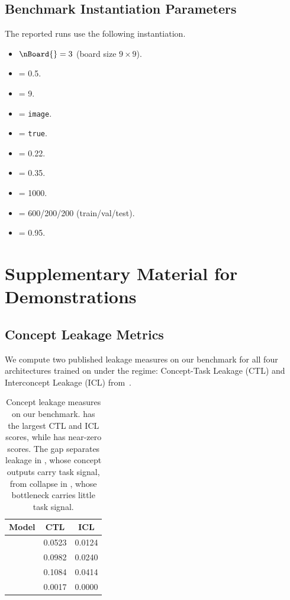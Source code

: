 \subsection{Benchmark Instantiation Parameters}
The reported  runs use the following instantiation.
\begin{itemize}
    \item $\nBoard{} = 3$ (board size $9 \times 9$).
    \item {} = 0.5.
    \item {} = 9.
    \item {} = \texttt{image}.
    \item {} = \texttt{true}.
    \item {} = 0.22.
    \item {} = 0.35.
    \item {} = 1000.
    \item {} = 600/200/200 (train/val/test).
    \item {} = 0.95.
\end{itemize}

\clearpage
\section{Supplementary Material for Demonstrations}
\label{Appendix::Demonstrations}

\subsection{Concept Leakage Metrics}
\label{Appendix::Leakage}

We compute two published leakage measures on our benchmark for all four architectures trained on  under the \regimePerfect{} regime: Concept-Task Leakage (\textsf{CTL}) and Interconcept Leakage (\textsf{ICL}) from~\citet{parisini2025leakage}.

\begin{table}[h]
\centering
\small
\begin{tabular}{lcc}
\toprule
Model & \textsf{CTL} & \textsf{ICL} \\
\midrule
\CBM{}     & 0.0523 & 0.0124 \\
\CEM{}     & 0.0982 & 0.0240 \\
\ProbCBM{} & 0.1084 & 0.0414 \\
\ECBM{}    & 0.0017 & 0.0000 \\
\bottomrule
\end{tabular}
\caption{Concept leakage measures on our benchmark. \ProbCBM{} has the largest \textsf{CTL} and \textsf{ICL} scores, while \ECBM{} has near-zero scores. The gap separates leakage in \ProbCBM{}, whose concept outputs carry task signal, from collapse in \ECBM{}, whose bottleneck carries little task signal.}
\label{Table::Leakage}
\end{table}

